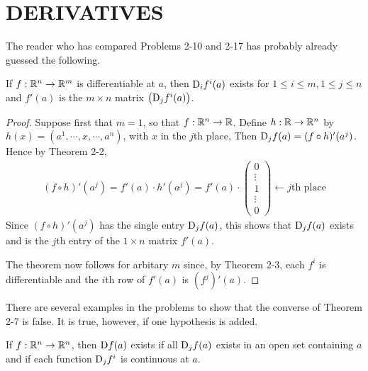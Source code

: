 \clearpage
\section{DERIVATIVES}
The reader who has compared Problems 2-10 and 2-17 has
probably already guessed the following.

\begin{theorem}
    If $f:\mathbb{R}^n\to \mathbb{R}^m$ is differentiable at $a$, then $\mathrm{D}_if^i(a)$ exists for
    $1\le i \le m, 1\le j\le n$ and $f'(a)$ is the $m\times n$ matrix $\left(\mathrm{D}_jf^i(a)\right)$.
\end{theorem}

\begin{proof}
    Suppose first that $m=1$, so that $f:\mathbb{R}^n\to \mathbb{R}$. Define $h:\mathbb{R}\to \mathbb{R}^n$ by 
    $h(x) = \left(a^1, \cdots, x, \cdots, a^n\right)$, with $x$ in the $j$th place, Then 
    $\mathrm{D}_jf(a) = (f\circ h)'(a^j)$. Hence by Theorem 2-2,
    \begin{align*}
        (f\circ h)'(a^j) 
        = f'(a)\cdot h'(a^j) 
        = f'(a) \cdot \left(\begin{matrix}
            0 \\ \vdots \\ 1 \\ \vdots \\ 0
        \end{matrix}\right)
        \leftarrow j\text{th place}
    \end{align*} 
    Since $(f\circ h)'(a^j)$ has the single entry $\mathrm{D}_jf(a)$, this shows that $\mathrm{D}_jf(a)$ exists and is the 
    $j$th entry of the $1\times n$ matrix $f'(a)$.

    The theorem now follows for arbitary $m$ since, by Theorem 2-3, each $f^i$ is differentiable and the 
    $i$th row of $f'(a)$ is $(f^j)'(a)$.
\end{proof}

There are several examples in the problems to show that the
converse of Theorem 2-7 is false. It is true, however, if one
hypothesis is added.

\begin{theorem}
    If $f:\mathbb{R}^n\to \mathbb{R}^n$, then $\mathrm{D}f(a)$ exists if all $\mathrm{D}_jf(a)$ exists in an open set containing 
    $a$ and if each function $\mathrm{D}_jf^i$ is continuous at $a$.
\end{theorem}

